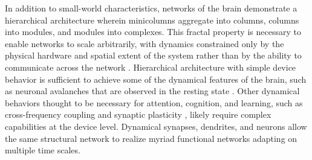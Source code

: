\documentclass[twocolumn]{article}
\begin{document}
\begin{figure}[tb]
\end{figure}

In addition to small-world characteristics, networks of the brain demonstrate a hierarchical architecture wherein minicolumns aggregate into columns, columns into modules, and modules into complexes. This fractal property is necessary to enable networks to scale arbitrarily, with dynamics constrained only by the physical hardware and spatial extent of the system rather than by the ability to communicate across the network \cite{plth2006}.  Hierarchical architecture with simple device behavior is sufficient to achieve some of the dynamical features of the brain, such as neuronal avalanches \cite{plth2006} that are observed in the resting state \cite{peth2009}. Other dynamical behaviors thought to be necessary for attention, cognition, and learning, such as cross-frequency coupling \cite{bu2006} and synaptic plasticity \cite{mage2012,ab2008,fudr2005}, likely require complex capabilities at the device level. Dynamical synapses, dendrites, and neurons allow the same structural network to realize myriad functional networks adapting on multiple time scales. 
\end{document}

